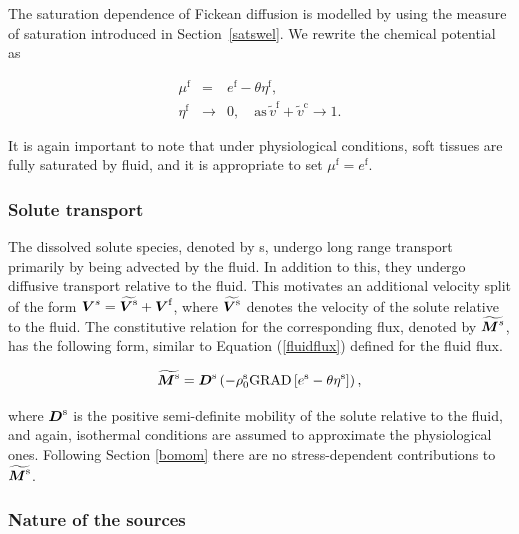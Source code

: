 The saturation dependence of Fickean diffusion is modelled by using
the measure of saturation introduced in Section~\ref{satswel}. We
rewrite the chemical potential as

\begin{eqnarray}
\mu^\mathrm{f} &=&  
e^\mathrm{f} - \theta\eta^\mathrm{f},\nonumber\\
\eta^\mathrm{f} &\to& 0, \quad \mbox{as}\, \tilde{v}^\mathrm{f} +
\tilde{v}^\mathrm{c} \to 1.
\label{fickeanmobility}
\end{eqnarray}

\noindent It is again important to note that under physiological
conditions, soft tissues are fully saturated by fluid, and it is
appropriate to set $\mu^\mathrm{f} = e^\mathrm{f}$.

\subsubsection{Solute transport}
\label{solute-transport}

The dissolved solute species, denoted by s, undergo long range
transport primarily by being 
advected by the fluid. In addition to this, they undergo diffusive
transport relative to the fluid. This motivates an additional velocity
split of the form $\mbox{\boldmath$ V$}^s=\widetilde{\mbox{\boldmath$ V$}^\mathrm{s}}+\mbox{\boldmath$ V$}^\mathrm{f}$,
where $\widetilde{\mbox{\boldmath$ V$}^\mathrm{s}}$ denotes the velocity of the solute
relative to the fluid. The constitutive relation for the corresponding
flux, denoted by $\widetilde{\mbox{\boldmath$ M$}^s}$, has the following form, similar
to Equation (\ref {fluidflux}) defined for the fluid flux.

\begin{equation}
\widetilde{\mbox{\boldmath$ M$}^\mathrm{s}} = \mbox{\boldmath$ D$}^\mathrm{s}\left(
- \rho^\mathrm{s}_0\mathrm{GRAD}\left[e^\mathrm{s} -
 \theta\eta^\mathrm{s}\right]\right),
\label{soluteflux}
\end{equation}

\noindent where $\mbox{\boldmath$ D$}^\mathrm{s}$ is the positive semi-definite
mobility of the solute relative to the fluid, and again, isothermal
conditions are assumed to approximate the physiological
ones. Following Section \ref{bomom} there are no stress-dependent
contributions to $\widetilde{\mbox{\boldmath$ M$}^\mathrm{s}}$.

\subsubsection{Nature of the sources}
\label{nature-of-sources}

